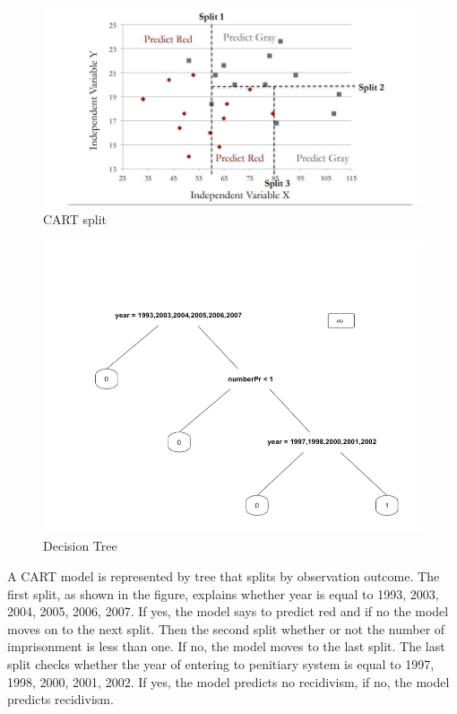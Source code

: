 \documentclass[a4paper,12pt]{article}
\begin{document}
\begin{figure}[h]
\centering
\includegraphics[scale=0.60]{CART.JPG}
\caption{CART split}
\label{fig:Figure 1}
\end{figure}

\begin{figure}[h]
\centering
\includegraphics[scale=0.50]{TREE1.jpg}
\caption{Decision Tree}
\label{fig:Figure 1}
\end{figure}

A CART model is represented by tree that splits by observation outcome. The first split, as shown in the figure,  explains whether year is equal to 1993, 2003, 2004, 2005, 2006, 2007. If yes, the model says to predict red and if no the model moves on to the next split. Then the second split whether or not the number of imprisonment is less than one. If no, the model moves to the last split. The last split checks whether the year of entering to penitiary system is equal to 1997, 1998, 2000, 2001, 2002. If yes, the model predicts no recidivism, if no, the model predicts recidivism. 
\end{document}
